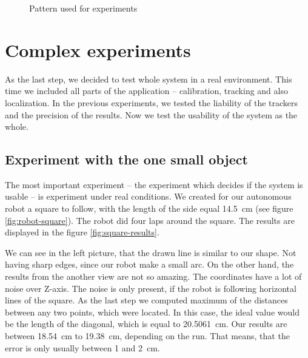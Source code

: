 \begin{figure}
\centering
{}
\caption{Pattern used for experiments}
\label{fig:grid}
\end{figure}

\section{Complex experiments}

As the last step, we decided to test whole system in a real environment. This
time we included all parts of the application -- calibration, tracking and also
localization. In the previous experiments, we tested the liability of the
trackers and the precision of the results. Now we test the usability of the
system as the whole.

\subsection{Experiment with the one small object}

The most important experiment -- the experiment which decides if the system is
usable -- is experiment under real conditions. We created for our autonomous
robot a square to follow, with the length of the side equal 14.5~cm (see figure
\ref{fig:robot-square}). The robot did four laps around the square. The
results are displayed in the figure \ref{fig:square-results}.

We can see in the left picture, that the drawn line is similar to our shape.
Not having sharp edges, since our robot make a small arc. On the other hand,
the results from the another view are not so amazing. The coordinates have a
lot of noise over Z-axis. The noise is only present, if the robot is following
horizontal lines of the square. As the last step we computed maximum of the
distances between any two points, which were located. In this case, the ideal
value would be the length of the diagonal, which is equal to 20.5061~cm. Our
results are between 18.54~cm to 19.38~cm, depending on the run. That means,
that the error is only usually between 1 and 2~cm.

